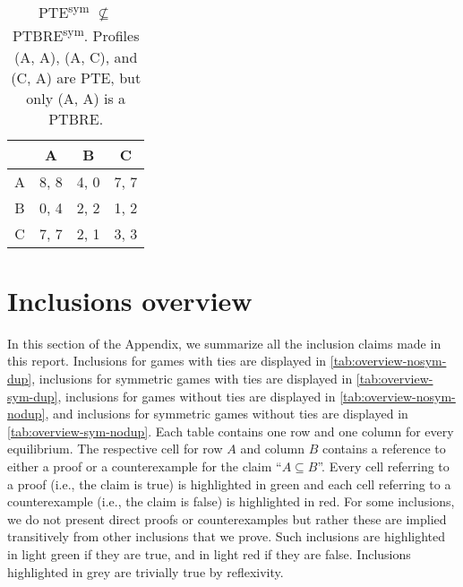 \begin{table}
	\caption{
		PTE\textsuperscript{sym} $\not\subseteq$ PTBRE\textsuperscript{sym}.
		Profiles (A, A), (A, C), and (C, A) are PTE, but only (A, A) is a PTBRE.
	}
	\label{tab:ties-pte-not-sub-ptbre}
	\centering
	\begin{tabular}{|c|c|c|c|}
		\hline
			& A		& B	   & C	  \\
		\hline
		A 		&\cellcolor{gray!00} 8, 8 &\cellcolor{gray!70} 4, 0 &\cellcolor{gray!00} 7, 7 \\
		\hline
		B		&\cellcolor{gray!70} 0, 4 &\cellcolor{gray!70} 2, 2 &\cellcolor{gray!70} 1, 2 \\
		\hline
		C		&\cellcolor{gray!00} 7, 7 &\cellcolor{gray!70} 2, 1 &\cellcolor{gray!70} 3, 3 \\
		\hline
	\end{tabular}
\end{table}


\section{Inclusions overview}
\label{sec:inclusions-overview}
In this section of the Appendix, we summarize all the inclusion claims made in this report.
Inclusions for games with ties are displayed in \autoref{tab:overview-nosym-dup}, inclusions for symmetric games with ties are displayed in \autoref{tab:overview-sym-dup}, inclusions for games without ties are displayed in \autoref{tab:overview-nosym-nodup}, and inclusions for symmetric games without ties are displayed in \autoref{tab:overview-sym-nodup}.
Each table contains one row and one column for every equilibrium.
The respective cell for row $A$ and column $B$ contains a reference to either a proof or a counterexample for the claim \enquote{$A \subseteq B$}.
Every cell referring to a proof (i.e., the claim is true) is highlighted in \colorbox{green!30}{green} and each cell referring to a counterexample (i.e., the claim is false) is highlighted in \colorbox{red!30}{red}.
For some inclusions, we do not present direct proofs or counterexamples but rather these are implied transitively from other inclusions that we prove.
Such inclusions are highlighted in \colorbox{green!15}{light green} if they are true, and in \colorbox{red!15}{light red} if they are false.
Inclusions highlighted in \colorbox{gray!30}{grey} are trivially true by reflexivity.

